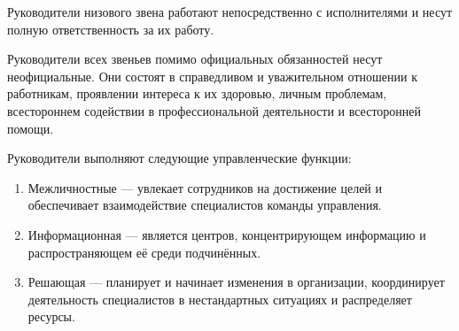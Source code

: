 \documentclass[12pt, russian, oneside, article]{ncc}
\begin{document}
Руководители низового звена работают непосредственно с исполнителями и несут полную ответственность за их работу.

Руководители всех звеньев помимо официальных обязанностей несут неофициальные. Они состоят в справедливом и уважительном отношении к работникам, проявлении интереса к их здоровью, личным проблемам, всестороннем содействии в профессиональной деятельности и всесторонней помощи.

Руководители выполняют следующие управленческие функции:
\begin{enumerate}
\item Межличностные ---  увлекает сотрудников на достижение целей и обеспечивает взаимодействие специалистов команды управления.
\item Информационная --- является центров, концентрирующем информацию и распространяющем её среди подчинённых.
\item Решающая --- планирует и начинает изменения в организации, координирует деятельность специалистов в нестандартных ситуациях и распределяет ресурсы.
\end{enumerate}
\end{document}
